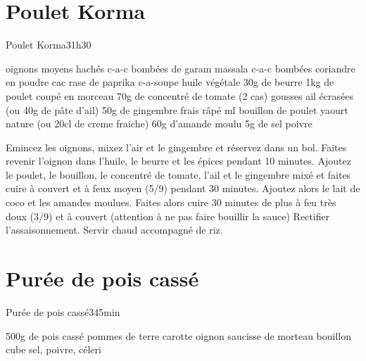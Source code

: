 {\section{Poulet Korma}
\begin{recette}{Poulet Korma}{3}{1h30}{}
\begin{ingredients}
\ingredient[etape 1]
 oignons moyens hachés
 c-a-c bombées de garam massala %
 c-a-c bombées coriandre en poudre
 cac rase de paprika
 c-a-soupe huile végétale
\ingredient 30g de beurre
\ingredient[etape 2]
\ingredient 1kg de poulet coupé en morceau
\ingredient 70g de concentré de tomate (2 cas)
 gousses ail écrasées (ou 40g de pâte d'ail)
\ingredient 50g de gingembre frais râpé %
 ml bouillon de poulet
\ingredient[etape 3]
 yaourt nature (ou 20cl de creme fraiche) %
\ingredient 60g d'amande moulu
\ingredient 5g de sel
\ingredient poivre
\end{ingredients}

\begin{preparation}
\etape Emincez les oignons, mixez l'air et le gingembre et réservez dans un bol.
\etape Faites revenir l'oignon dans l'huile, le beurre et les épices pendant 10 minutes. 
\etape Ajoutez le poulet, le bouillon, le concentré de tomate, l'ail et le gingembre mixé et faites cuire à couvert et à feux moyen (5/9) pendant 30 minutes.
\etape Ajoutez alors le lait de coco et les amandes moulues. Faites alors cuire 30 minutes de plus à feu très doux (3/9) et à couvert (attention à ne pas faire bouillir la sauce) Rectifier l'assaisonnement.
\etape Servir chaud accompagné de riz.
\end{preparation}
\end{recette}

\section{Purée de pois cassé}
\begin{recette}{Purée de pois cassé}{3}{45min}{}

\begin{ingredients}
\ingredient 500g de pois cassé
 pommes de terre
 carotte
 oignon
 saucisse de morteau
 bouillon cube
\ingredient sel, poivre, céleri
\end{ingredients}


\end{recette}}

